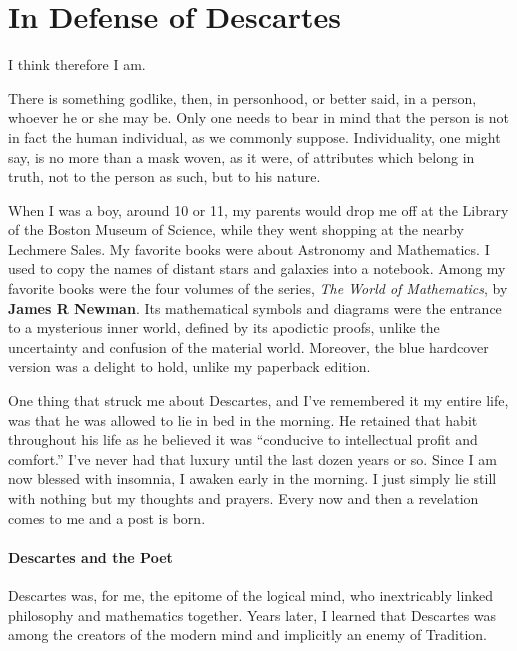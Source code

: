 \section{In Defense of Descartes}

\begin{quotex}
I think therefore I am.

There is something godlike, then, in personhood, or better said, in a person, whoever he or she may be. Only one needs to bear in mind that the person is not in fact the human individual, as we commonly suppose. Individuality, one might say, is no more than a mask woven, as it were, of attributes which belong in truth, not to the person as such, but to his nature.
\end{quotex}


When I was a boy, around 10 or 11, my parents would drop me off at the Library of the Boston Museum of Science, while they went shopping at the nearby Lechmere Sales. My favorite books were about Astronomy and Mathematics. I used to copy the names of distant stars and galaxies into a notebook. Among my favorite books were the four volumes of the series, \emph{The World of Mathematics}, by \textbf{James R Newman}. Its mathematical symbols and diagrams were the entrance to a mysterious inner world, defined by its apodictic proofs, unlike the uncertainty and confusion of the material world. Moreover, the blue hardcover version was a delight to hold, unlike my paperback edition.

One thing that struck me about Descartes, and I've remembered it my entire life, was that he was allowed to lie in bed in the morning. He retained that habit throughout his life as he believed it was ``conducive to intellectual profit and comfort.'' I've never had that luxury until the last dozen years or so. Since I am now blessed with insomnia, I awaken early in the morning. I just simply lie still with nothing but my thoughts and prayers. Every now and then a revelation comes to me and a post is born.

\paragraph{Descartes and the Poet}

Descartes was, for me, the epitome of the logical mind, who inextricably linked philosophy and mathematics together. Years later, I learned that Descartes was among the creators of the modern mind and implicitly an enemy of Tradition.

